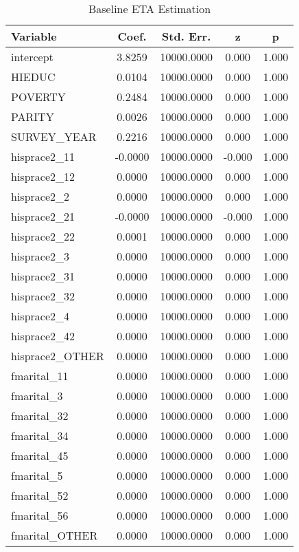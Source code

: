 \begin{table}[htbp]\centering\caption{Baseline ETA Estimation}\begin{tabular}{lcccc}\toprule
Variable & Coef. & Std. Err. & z & p \\
\midrule
intercept & 3.8259 & 10000.0000 & 0.000 & 1.000 \\
HIEDUC & 0.0104 & 10000.0000 & 0.000 & 1.000 \\
POVERTY & 0.2484 & 10000.0000 & 0.000 & 1.000 \\
PARITY & 0.0026 & 10000.0000 & 0.000 & 1.000 \\
SURVEY\_YEAR & 0.2216 & 10000.0000 & 0.000 & 1.000 \\
hisprace2\_11 & -0.0000 & 10000.0000 & -0.000 & 1.000 \\
hisprace2\_12 & 0.0000 & 10000.0000 & 0.000 & 1.000 \\
hisprace2\_2 & 0.0000 & 10000.0000 & 0.000 & 1.000 \\
hisprace2\_21 & -0.0000 & 10000.0000 & -0.000 & 1.000 \\
hisprace2\_22 & 0.0001 & 10000.0000 & 0.000 & 1.000 \\
hisprace2\_3 & 0.0000 & 10000.0000 & 0.000 & 1.000 \\
hisprace2\_31 & 0.0000 & 10000.0000 & 0.000 & 1.000 \\
hisprace2\_32 & 0.0000 & 10000.0000 & 0.000 & 1.000 \\
hisprace2\_4 & 0.0000 & 10000.0000 & 0.000 & 1.000 \\
hisprace2\_42 & 0.0000 & 10000.0000 & 0.000 & 1.000 \\
hisprace2\_OTHER & 0.0000 & 10000.0000 & 0.000 & 1.000 \\
fmarital\_11 & 0.0000 & 10000.0000 & 0.000 & 1.000 \\
fmarital\_3 & 0.0000 & 10000.0000 & 0.000 & 1.000 \\
fmarital\_32 & 0.0000 & 10000.0000 & 0.000 & 1.000 \\
fmarital\_34 & 0.0000 & 10000.0000 & 0.000 & 1.000 \\
fmarital\_45 & 0.0000 & 10000.0000 & 0.000 & 1.000 \\
fmarital\_5 & 0.0000 & 10000.0000 & 0.000 & 1.000 \\
fmarital\_52 & 0.0000 & 10000.0000 & 0.000 & 1.000 \\
fmarital\_56 & 0.0000 & 10000.0000 & 0.000 & 1.000 \\
fmarital\_OTHER & 0.0000 & 10000.0000 & 0.000 & 1.000 \\

\end{tabular}
\end{table}
